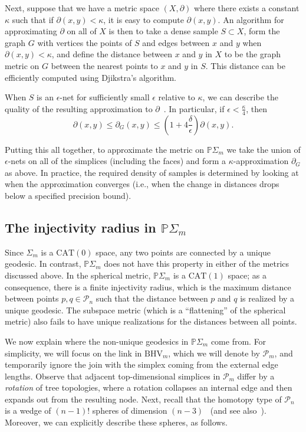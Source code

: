 \documentclass[a4paper,11pt]{article}
\newcommand{\CAT}{\textrm{CAT}}
\newcommand{\BHV}{\textrm{BHV}}
\newcommand{\aP}{\mathcal{P}}
\begin{document}
Next, suppose that we have a metric space $(X,\partial)$ where there exists a constant $\kappa$ such that if $\partial(x,y) < \kappa$, it is easy to compute $\partial(x,y)$.
An algorithm for approximating $\partial$ on all of $X$ is then to take a dense sample $S \subset X$, form the graph $G$ with vertices the points of $S$ and edges between $x$ and $y$ when $\partial(x,y) < \kappa$, and define the distance between $x$ and $y$ in $X$ to be the graph metric on $G$ between the nearest points to $x$ and $y$ in $S$.
This distance can be efficiently computed using Djikstra's algorithm.

When $S$ is an $\epsilon$-net for sufficiently small $\epsilon$ relative to $\kappa$, we can describe the quality of the resulting approximation to $\partial$~\cite[Thm. 2]{bernstein2000graph}.
In particular, if $\epsilon < \frac{\kappa}{4}$, then 
\[
\partial(x,y) \leq \partial_G(x,y) \leq (1 + 4\frac{\delta}{\epsilon}) \partial(x,y).
\]

Putting this all together, to approximate the metric on $\mathbb{P}\Sigma_m$ we take the union of $\epsilon$-nets on all of the simplices (including the faces) and form a $\kappa$-approximation $\partial_G$ as above.
In practice, the required density of samples is determined by looking at when the approximation converges (i.e., when the change in distances drops below a specified precision bound).

\subsection{The injectivity radius in $\mathbb{P}\Sigma_m$}

Since $\Sigma_m$ is a $\CAT(0)$ space, any two points are connected by a unique geodesic.
In contrast, $\mathbb{P}\Sigma_m$ does not have this property in either of the metrics discussed above.
In the spherical metric, $\mathbb{P}\Sigma_m$ is a $\CAT(1)$ space; as a consequence, there is a finite injectivity radius, which is the maximum distance between points $p,q \in \aP_n$ such that the distance between $p$ and $q$ is realized by a unique geodesic.
The subspace metric (which is a ``flattening'' of the spherical metric) also fails to have unique realizations for the distances between all points.

We now explain where the non-unique geodesics in $\mathbb{P}\Sigma_m$ come from.
For simplicity, we will focus on the link in $\BHV_m$, which we will denote by $\aP_m$, and temporarily ignore the join with the simplex coming from the external edge lengths.
Observe that adjacent top-dimensional simplices in $\aP_m$ differ by a {\em rotation} of tree topologies, where a rotation collapses an internal edge and then expands out from the resulting node.
Next, recall that the homotopy type of $\aP_n$ is a wedge of $(n-1)!$ spheres of dimension $(n-3)$~\cite{robinson1996tree} (and see also~\cite[Thm. 6]{devadoss2014polyhedral}).
Moreover, we can explicitly describe these spheres, as follows.
\end{document}
